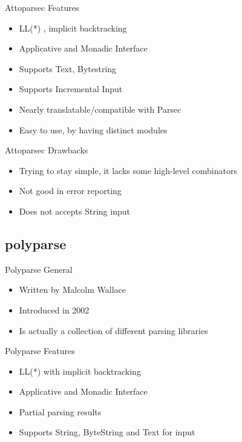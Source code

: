 \documentclass{beamer}
\begin{document}
\begin{frame}{Attoparsec Features}
\begin{itemize}
\item LL(*) , implicit backtracking
\item Applicative and Monadic Interface
\item Supports Text, Bytestring
\item Supports Incremental Input %
\item Nearly translatable/compatible with Parsec
\item Easy to use, by having distinct modules
\end{itemize}
\end{frame}

\begin{frame}{Attoparsec Drawbacks}
\begin{itemize}
\item Trying to stay simple, it lacks some high-level combinators
\item Not good in error reporting
\item Does not accepts String input 
\end{itemize}
\end{frame}

\subsection{polyparse}

\begin{frame}{Polyparse General}
\begin{itemize}
\item Written by Malcolm Wallace
\item Introduced in 2002
\item Is actually a collection of different parsing libraries
\end{itemize}
\end{frame}

\begin{frame}{Polyparse Features}
\begin{itemize}
\item LL(*) with implicit backtracking
\item Applicative and Monadic Interface
\item Partial parsing results 
\item Supports String, ByteString and Text for input
\end{itemize}
\end{frame}
\end{document}
